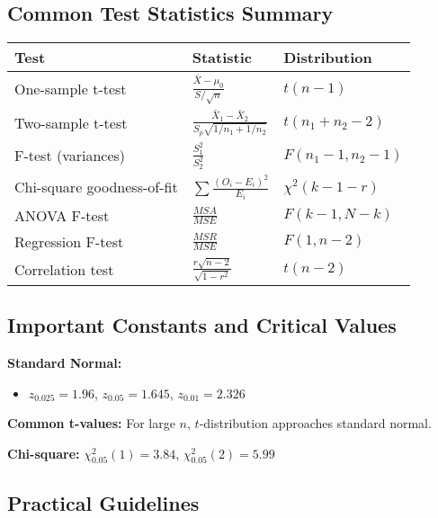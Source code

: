 \documentclass[12pt,a4paper]{amsart}
\theoremstyle{remark}
\begin{document}
\subsection{Common Test Statistics Summary}

\begin{table}[h]
\centering
\begin{tabular}{|l|l|l|}
\hline
\textbf{Test} & \textbf{Statistic} & \textbf{Distribution} \\
\hline
One-sample t-test & $\frac{\bar{X} - \mu_0}{S/\sqrt{n}}$ & $t(n-1)$ \\
\hline
Two-sample t-test & $\frac{\bar{X}_1 - \bar{X}_2}{S_p\sqrt{1/n_1 + 1/n_2}}$ & $t(n_1+n_2-2)$ \\
\hline
F-test (variances) & $\frac{S_1^2}{S_2^2}$ & $F(n_1-1, n_2-1)$ \\
\hline
Chi-square goodness-of-fit & $\sum \frac{(O_i - E_i)^2}{E_i}$ & $\chi^2(k-1-r)$ \\
\hline
ANOVA F-test & $\frac{MSA}{MSE}$ & $F(k-1, N-k)$ \\
\hline
Regression F-test & $\frac{MSR}{MSE}$ & $F(1, n-2)$ \\
\hline
Correlation test & $\frac{r\sqrt{n-2}}{\sqrt{1-r^2}}$ & $t(n-2)$ \\
\hline
\end{tabular}
\end{table}

\subsection{Important Constants and Critical Values}

\textbf{Standard Normal:}
\begin{itemize}
\item $z_{0.025} = 1.96$, $z_{0.05} = 1.645$, $z_{0.01} = 2.326$
\end{itemize}

\textbf{Common t-values:} For large $n$, $t$-distribution approaches standard normal.

\textbf{Chi-square:} $\chi^2_{0.05}(1) = 3.84$, $\chi^2_{0.05}(2) = 5.99$

\subsection{Practical Guidelines}
\end{document}
